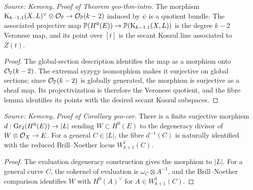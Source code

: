 \begin{theorem}
  \label{thm:kemeny_veronese_identification}
  \textit{Source: Kemeny, Proof of Theorem geo-thm-intro.}
  The morphism
  \(\mathrm{K}_{k-1,1}(X,L)^\vee\otimes\mathcal{O}_{\mathbb{P}}\to\mathcal{O}_{\mathbb{P}}(k-2)\) induced by \(\psi\)
  is a quotient bundle.  The associated projective map
  \(\mathbb{P}(H^0(E))\to\mathbb{P}(\mathrm{K}_{k-1,1}(X,L))\) is the degree \(k-2\) Veronese map, and
  its point over \([t]\) is the secant Koszul line associated to \(Z(t)\).
\end{theorem}
\begin{proof}
  The global-section description identifies the map as a morphism onto
  \(\mathcal{O}_{\mathbb{P}}(k-2)\).  The extremal syzygy isomorphism makes it surjective on
  global sections; since \(\mathcal{O}_{\mathbb{P}}(k-2)\) is globally generated, the morphism is
  surjective as a sheaf map.  Its projectivization is therefore the Veronese
  quotient, and the fibre lemma identifies its points with the desired secant
  Koszul subspaces.
\end{proof}

\begin{lemma}
  \label{lem:kemeny_grassmann_pencil_map}
  \textit{Source: Kemeny, Proof of Corollary geo-cor.}
  There is a finite surjective morphism
  \(d:\mathrm{Gr}_2(H^0(E))\to |L|\) sending \(W\subset H^0(E)\) to the degeneracy
  divisor of \(W\otimes\mathcal{O}_X\to E\).  For a general \(C\in|L|\), the fibre
  \(d^{-1}(C)\) is naturally identified with the reduced Brill--Noether locus
  \(W^1_{k+1}(C)\).
\end{lemma}
\begin{proof}
  The evaluation degeneracy construction gives the morphism to \(|L|\).  For a
  general curve \(C\), the cokernel of evaluation is \(\omega_C\otimes A^{-1}\),
  and the Brill--Noether comparison identifies \(W\) with \(H^0(A)^\vee\) for
  \(A\in W^1_{k+1}(C)\).
\end{proof}

